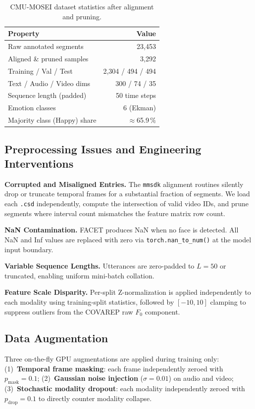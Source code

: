 \documentclass[conference]{IEEEtran}
\begin{document}
\begin{table}[htbp]
\caption{CMU-MOSEI dataset statistics after alignment and pruning.}
\begin{center}
\begin{tabular}{@{}lr@{}}
\toprule
\textbf{Property} & \textbf{Value} \\
\midrule
Raw annotated segments & 23,453 \\
Aligned \& pruned samples & 3,292 \\
Training / Val / Test & 2,304 / 494 / 494 \\
\midrule
Text / Audio / Video dims & 300 / 74 / 35 \\
Sequence length (padded) & 50 time steps \\
Emotion classes & 6 (Ekman) \\
Majority class (Happy) share & $\approx$65.9\,\% \\
\bottomrule
\end{tabular}
\label{tab:dataset_stats}
\end{center}
\end{table}

\subsection{Preprocessing Issues and Engineering Interventions}
\label{sec:special_issues}

\textbf{Corrupted and Misaligned Entries.}
The \texttt{mmsdk} alignment routines silently drop or truncate temporal frames
for a substantial fraction of segments.  We load each \texttt{.csd}
independently, compute the intersection of valid video IDs, and prune segments
where interval count mismatches the feature matrix row count.

\textbf{NaN Contamination.}
FACET produces NaN when no face is detected.  All NaN and Inf values are
replaced with zero via \texttt{torch.nan\_to\_num()} at the model input boundary.

\textbf{Variable Sequence Lengths.}
Utterances are zero-padded to $L=50$ or truncated, enabling uniform mini-batch
collation.

\textbf{Feature Scale Disparity.}
Per-split Z-normalization is applied independently to each modality using
training-split statistics, followed by $[-10, 10]$ clamping to suppress
outliers from the COVAREP raw $F_0$ component.

\label{sec:preprocessing}

\subsection{Data Augmentation}
Three on-the-fly GPU augmentations are applied during training only:
(1)~\textbf{Temporal frame masking}: each frame independently zeroed with
$p_{\mathrm{mask}}=0.1$; (2)~\textbf{Gaussian noise injection}
($\sigma=0.01$) on audio and video; (3)~\textbf{Stochastic modality dropout}:
each modality independently zeroed with $p_{\mathrm{drop}}=0.1$ to directly
counter modality collapse.
\end{document}
